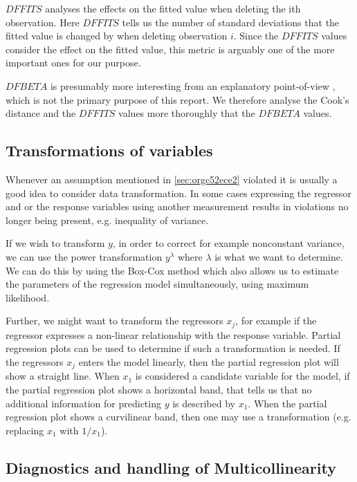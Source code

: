 \documentclass[11pt]{article}
\begin{document}
\(DFFITS\) analyses the effects on the fitted value when deleting the ith observation. Here \(DFFITS\) tells us
the number of standard deviations that the fitted value is changed by when deleting observation \(i\). Since 
the \(DFFITS\) values consider the effect on the fitted value, this metric is arguably one of the more important 
ones for our purpose.

\(DFBETA\) is presumably more interesting from an explanatory point-of-view \cite{22286}, which is not the
primary purpose of this report. We therefore analyse the Cook's distance and the \(DFFITS\) values more
thoroughly that the \(DFBETA\) values.

\subsection{Transformations of variables}
\label{sec:org8b97ce2}

Whenever an assumption mentioned in \ref{sec:orgc52ece2} violated it is usually a good idea to consider data 
transformation. In some cases expressing the regressor and or the response variables using another measurement
results in violations no longer being present, e.g. inequality of variance. 

If we wish to transform \(y\), in order to correct for example nonconstant variance, we can use the power
transformation \(y^\lambda\) where \(\lambda\) is what we want to determine. We can do this by using the Box-Cox method
which also allows us to estimate the parameters of the regression model simultaneously, using maximum likelihood.

Further, we might want to transform the regressors \(x_j\), for example if the regressor expresses a non-linear 
relationship with the response variable. Partial regression plots can be used to determine if such a transformation
is needed. If the regressors \(x_j\) enters the model linearly, then the partial regression plot will show a
straight line. When \(x_1\) is considered a candidate variable for the model, if the
partial regression plot shows a horizontal band, that tells us that no additional information for predicting \(y\) is 
described by \(x_1\). When the partial regression plot shows a curvilinear band, then one may use a transformation 
(e.g. replacing \(x_1\) with \(1/x_1\)).

\subsection{Diagnostics and handling of Multicollinearity}
\label{sec:orgb74a096}
\end{document}

